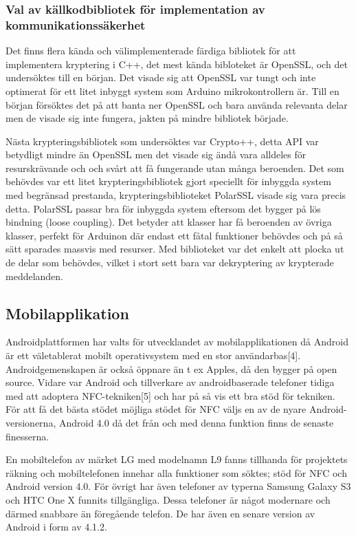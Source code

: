 \documentclass[11pt]{article}
\begin{document}
\subsubsection{ Val av källkodbibliotek för implementation av kommunikationssäkerhet}
Det finns flera kända och välimplementerade färdiga bibliotek för att implementera kryptering i C++,  det mest kända bibloteket är OpenSSL, och det undersöktes till en början. Det visade sig att OpenSSL var tungt och inte optimerat för ett litet inbyggt system som Arduino mikrokontrollern är. Till en början försöktes det på att banta ner OpenSSL och bara använda relevanta delar men de visade sig inte fungera, jakten på mindre bibliotek började. 

Nästa krypteringsbibliotek som undersöktes var Crypto++, detta API var betydligt mindre än OpenSSL men det visade sig ändå vara alldeles för resurskrävande och och svårt att få fungerande utan många beroenden. Det som behövdes var ett litet krypteringsbibliotek gjort speciellt för inbyggda system med begränsad prestanda, krypteringsbiblioteket PolarSSL visade sig vara precis detta. PolarSSL passar bra för inbyggda system eftersom det bygger på lös bindning (loose coupling). Det betyder att klasser har få beroenden av övriga klasser, perfekt för Arduinon där endast ett fåtal funktioner behövdes och på så sätt sparades massvis med resurser. Med biblioteket var det enkelt att plocka ut de delar som behövdes, vilket i stort sett bara var dekryptering av krypterade meddelanden.

\subsection{Mobilapplikation}
Androidplattformen har valts för utvecklandet av mobilapplikationen då Android är ett väletablerat mobilt operativsystem med en stor användarbas[4]. Androidgemenskapen är också öppnare än t ex Apples, då den bygger på open source. Vidare var Android och tillverkare av androidbaserade telefoner tidiga med att adoptera NFC-tekniken[5] och har på så vis ett bra stöd för tekniken. För att få det bästa stödet möjliga stödet för NFC väljs en av de nyare Android-versionerna, Android 4.0 då det från och med denna funktion finns de senaste finesserna.

En mobiltelefon av märket LG med modelnamn L9 fanns tillhanda för projektets räkning och mobiltelefonen innehar alla funktioner som söktes; stöd för NFC och Android version 4.0. För övrigt har även telefoner av typerna Samsung Galaxy S3 och HTC One X funnits tillgängliga. Dessa telefoner är något modernare och därmed snabbare än föregående telefon. De har även en senare version av Android i form av 4.1.2.
\end{document}

